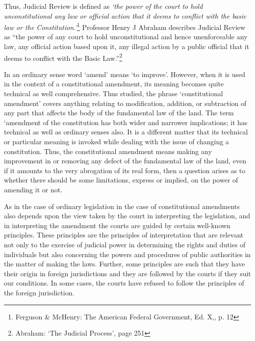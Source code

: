 \begin{multicols}{2}
\noi
Thus, Judicial Review is defined as \textit{‘the power of the court to hold
unconstitutional any law or official action that it deems to conflict with the basic law
or the Constitution.’}\footnote{Ferguson \& McHenry: The American Federal Government, Ed. X,, p. 12} Professor Henry J Abraham describes Judicial Review as “the
power of any court to hold unconstitutional and hence unenforceable any law, any
official action based upon it, any illegal action by a public official that it deems to
conflict with the Basic Law.”\footnote{ Abraham: ‘The Judicial Process’, page 251}


\noi
In an ordinary sense word ‘amend’ means ‘to improve’. However, when it is
used in the context of a constitutional amendment, its meaning becomes quite technical
as well comprehensive. Thus studied, the phrase ‘constitutional amendment’ covers
anything relating to modification, addition, or subtraction of any part that affects the
body of the fundamental law of the land. The term ‘amendment of the constitution has
both wider and narrower implications; it has technical as well as ordinary senses also.
It is a different matter that its technical or particular meaning is invoked while dealing
with the issue of changing a constitution. Thus, the constitutional amendment means
making any improvement in or removing any defect of the fundamental law of the land,
even if it amounts to the very abrogation of its real form, then a question arises as to
whether there should be some limitations, express or implied, on the power of amending
it or not.

\noi
As in the case of ordinary legislation in the case of constitutional amendments also
depends upon the view taken by the court in interpreting the legislation, and in
interpreting the amendment the courts are guided by certain well-known principles.
These principles are the principles of interpretation that are relevant not only to the
exercise of judicial power in determining the rights and duties of individuals but also
concerning the powers and procedures of public authorities in the matter of making the
laws. Further, some principles are such that they have their origin in foreign
jurisdictions and they are followed by the courts if they suit our conditions. In some
cases, the courts have refused to follow the principles of the foreign jurisdiction.



\end{multicols}
